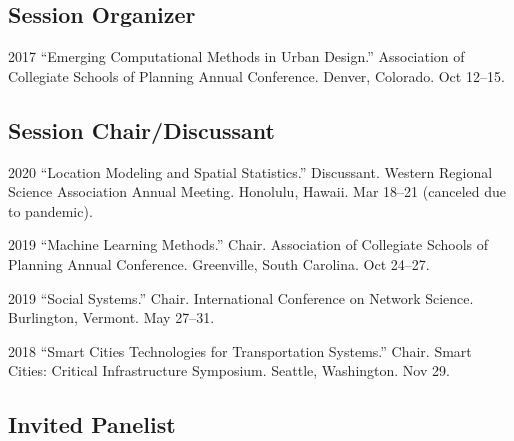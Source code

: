 \documentclass[12pt,letterpaper]{report}
\begin{document}
    \subsection*{Session Organizer}

    \begin{tablist}

        \item[2017] \tab \enquote{Emerging Computational Methods in Urban Design.} Association of Collegiate Schools of Planning Annual Conference. Denver, Colorado. Oct 12--15.

    \end{tablist}

    \subsection*{Session Chair/Discussant}

    \begin{tablist}

        \item[2020] \tab \enquote{Location Modeling and Spatial Statistics.} Discussant. Western Regional Science Association Annual Meeting. Honolulu, Hawaii. Mar 18--21 (canceled due to pandemic).

        \item[2019] \tab \enquote{Machine Learning Methods.} Chair. Association of Collegiate Schools of Planning Annual Conference. Greenville, South Carolina. Oct 24--27.

        \item[2019] \tab \enquote{Social Systems.} Chair. International Conference on Network Science. Burlington, Vermont. May 27--31.

        \item[2018] \tab \enquote{Smart Cities Technologies for Transportation Systems.} Chair. Smart Cities: Critical Infrastructure Symposium. Seattle, Washington. Nov 29.

    \end{tablist}

    \subsection*{Invited Panelist}
\end{document}
